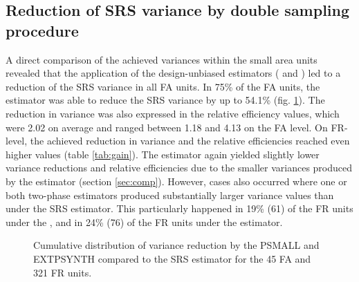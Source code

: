 \subsection{Reduction of SRS variance by double sampling procedure}
\label{sec:gain_eval}

A direct comparison of the achieved variances within the small area units revealed that the application of the design-unbiased estimators (\psmall{} and \extpsynth{}) led to a reduction of the SRS variance in all FA units. In 75\% of the FA units, the \extpsynth{} estimator was able to reduce the SRS variance by up to 54.1\% (fig. \ref{fig:gain}). The reduction in variance was also expressed in the relative efficiency values, which were 2.02 on average and ranged between 1.18 and 4.13 on the FA level. On FR-level, the achieved reduction in variance and the relative efficiencies reached even higher values (table \ref{tab:gain}). The \psmall{} estimator again yielded slightly lower variance reductions and relative efficiencies due to the smaller variances produced by the \extpsynth{} estimator (section \ref{sec:comp}). However, cases also occurred where one or both two-phase estimators produced substantially larger variance values than under the SRS estimator. This particularly happened in 19\% (61) of the FR units under the \extpsynth{}, and in 24\% (76) of the FR units under the \psmall{} estimator.

\begin{figure}[H]
	\centering
	\caption{Cumulative distribution of variance reduction by the PSMALL and EXTPSYNTH compared to the SRS estimator for the  45 FA and 321 FR units.}
	\label{fig:gain}
\end{figure}


